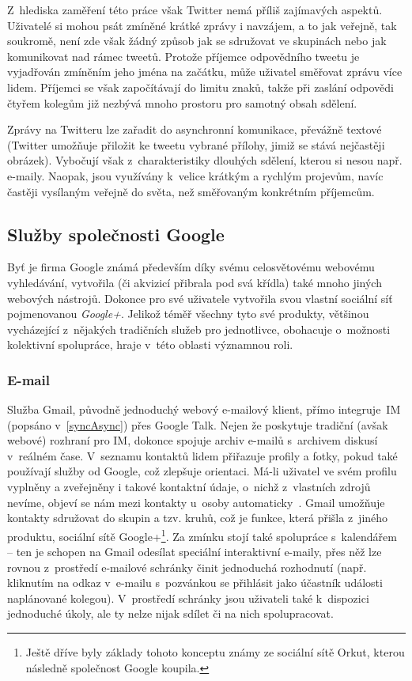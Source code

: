 \documentclass[12pt,oneside,final]{fithesis2}
\begin{document}
Z~hlediska zaměření této práce však Twitter nemá příliš zajímavých aspektů. Uživatelé si mohou psát zmíněné krátké zprávy i navzájem, a to jak veřejně, tak soukromě, není zde však žádný způsob jak se sdružovat ve skupinách nebo jak komunikovat nad rámec tweetů. Protože příjemce odpovědního tweetu je vyjadřován zmíněním jeho jména na začátku, může uživatel směřovat zprávu více lidem. Příjemci se však započítávají do limitu znaků, takže při zaslání odpovědi čtyřem kolegům již nezbývá mnoho prostoru pro samotný obsah sdělení.

Zprávy na Twitteru lze zařadit do asynchronní komunikace, převážně textové (Twitter umožňuje přiložit ke tweetu vybrané přílohy, jimiž se stává nejčastěji obrázek). Vybočují však z~charakteristiky dlouhých sdělení, kterou si nesou např. e-maily. Naopak, jsou využívány k~velice krátkým a rychlým projevům, navíc častěji vysílaným veřejně do světa, než směřovaným konkrétním příjemcům.

\subsection{Služby společnosti Google}\label{google}
Byť je firma Google známá především díky svému celosvětovému webovému vyhledávání, vytvořila (či akvizicí přibrala pod svá křídla) také mnoho jiných webových nástrojů. Dokonce pro své uživatele vytvořila svou vlastní sociální síť pojmenovanou \emph{Google+}. Jelikož téměř všechny tyto své produkty, většinou vycházející z~nějakých tradičních služeb pro jednotlivce, obohacuje o~možnosti kolektivní spolupráce, hraje v~této oblasti významnou roli.

\subsubsection*{E-mail}
Služba Gmail, původně jed\-no\-du\-chý we\-bo\-vý e-mailový klient, přímo in\-te\-gru\-je~IM (popsáno v~\ref{syncAsync}) přes Google Talk. Nejen že poskytuje tradiční (avšak webové) rozhraní pro IM, dokonce spojuje archiv e-mailů s~archivem diskusí v~reálném čase. V~seznamu kontaktů lidem přiřazuje profily a fotky, pokud také používají služby od Google, což zlepšuje orientaci. Má-li uživatel ve svém profilu vyplněny a zveřejněny i takové kontaktní údaje, o~nichž z~vlastních zdrojů nevíme, objeví se nám mezi kontakty u~osoby automaticky~\cite{striebeck2010gmail}. Gmail umožňuje kontakty sdružovat do skupin a tzv. kruhů, což je funkce, která přišla z~jiného produktu, sociální sítě Google+\footnote{Ještě dříve byly základy tohoto konceptu známy ze sociální sítě Orkut, kterou následně společnost Google koupila.}. Za zmínku stojí také spolupráce s~kalendářem -- ten je schopen na Gmail odesílat speciální interaktivní e-maily, přes něž lze rovnou z~prostředí e-mailové schrán\-ky činit jednoduchá rozhodnutí (např. kliknutím na odkaz v~e-mailu s~pozvánkou se přihlásit jako účastník události naplánované kolegou). V~prostředí schránky jsou uživateli také k~dispozici jednoduché úkoly, ale ty nelze nijak sdílet či na nich spolupracovat.
\end{document}
